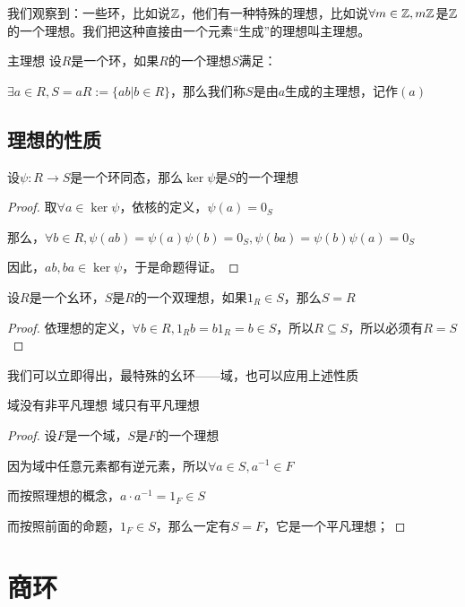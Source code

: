 \documentclass[12pt, a4paper, oneside, UTF8]{ctexbook}
\begin{document}
			我们观察到：一些环，比如说$\mathbb{Z}$，他们有一种特殊的理想，比如说$\forall m \in \mathbb{Z},m\mathbb{Z}$是$\mathbb{Z}$的一个理想。我们把这种直接由一个元素“生成”的理想叫主理想。
			\begin{defn}{主理想}{}
				设$R$是一个环，如果$R$的一个理想$S$满足：

				$\exists a \in R,S=aR := \{ab | b \in R\}$，那么我们称$S$是由$a$生成的主理想，记作$(a)$
			\end{defn}
		\subsection{理想的性质}
		\begin{para}{0}
			\point{}
				\begin{proposition}
					设$\psi :R \rightarrow S$是一个环同态，那么$\ker \psi$是$S$的一个理想
				\end{proposition}
				\begin{proof}
					取$\forall a \in \ker \psi$，依核的定义，$\psi (a)=0_S$

					那么，$\forall b \in R,\psi (ab)=\psi (a)\psi (b)=0_S,\psi (ba)=\psi (b)\psi (a)=0_S$

					因此，$ab,ba \in \ker \psi$，于是命题得证。
				\end{proof}
			\point{}
				\begin{proposition}
					设$R$是一个幺环，$S$是$R$的一个双理想，如果$1_R \in S$，那么$S=R$
				\end{proposition}
				\begin{proof}
					依理想的定义，$\forall b \in R,1_R b=b 1_R = b \in S$，所以$R \subseteq S$，所以必须有$R=S$
				\end{proof}
				我们可以立即得出，最特殊的幺环——域，也可以应用上述性质
				\begin{corollary}{域没有非平凡理想}{}
					域只有平凡理想
				\end{corollary}
				\begin{proof}
					设$F$是一个域，$S$是$F$的一个理想

					因为域中任意元素都有逆元素，所以$\forall a \in S,a^{-1} \in F$

					而按照理想的概念，$a \cdot a^{-1}=1_F \in S$

					而按照前面的命题，$1_F \in S$，那么一定有$S = F$，它是一个平凡理想；
				\end{proof}
		\end{para}
	\section{商环}
\end{document}
